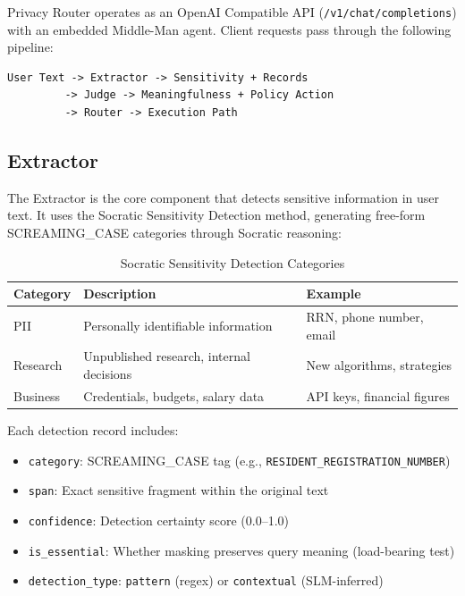 \documentclass[11pt,a4paper]{article}
\begin{document}
Privacy Router operates as an OpenAI Compatible API (\texttt{/v1/chat/completions}) with an embedded Middle-Man agent. Client requests pass through the following pipeline:

\begin{verbatim}
User Text -> Extractor -> Sensitivity + Records
         -> Judge -> Meaningfulness + Policy Action
         -> Router -> Execution Path
\end{verbatim}

\subsection{Extractor}

The Extractor is the core component that detects sensitive information in user text. It uses the Socratic Sensitivity Detection method, generating free-form SCREAMING\_CASE categories through Socratic reasoning:

\begin{table}[h]
\centering
\begin{tabular}{@{}lll@{}}
\toprule
Category & Description & Example \\
\midrule
PII & Personally identifiable information & RRN, phone number, email \\
Research & Unpublished research, internal decisions & New algorithms, strategies \\
Business & Credentials, budgets, salary data & API keys, financial figures \\
\bottomrule
\end{tabular}
\caption{Socratic Sensitivity Detection Categories}
\end{table}

Each detection record includes:

\begin{itemize}[nosep]
  \item \texttt{category}: SCREAMING\_CASE tag (e.g., \texttt{RESIDENT\_REGISTRATION\_NUMBER})
  \item \texttt{span}: Exact sensitive fragment within the original text
  \item \texttt{confidence}: Detection certainty score (0.0--1.0)
  \item \texttt{is\_essential}: Whether masking preserves query meaning (load-bearing test)
  \item \texttt{detection\_type}: \texttt{pattern} (regex) or \texttt{contextual} (SLM-inferred)
\end{itemize}
\end{document}
